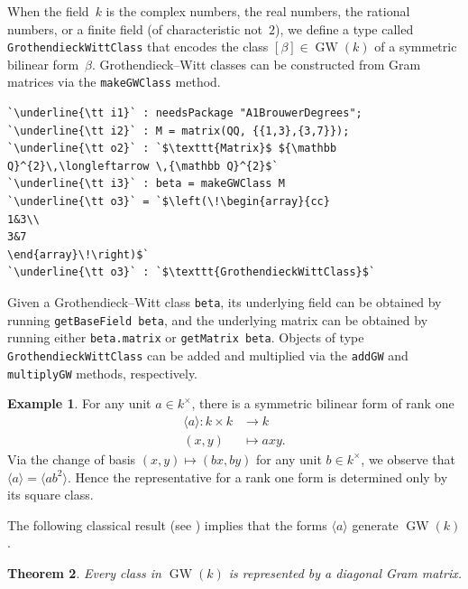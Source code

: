 \documentclass[12pt]{amsart}
\newtheorem{theorem}{Theorem}
\theoremstyle{definition}
\newtheorem{example}[theorem]{Example}
\DeclareMathOperator{\GW}{GW}
\begin{document}
When the field~$k$ is the complex numbers, the real numbers, the rational numbers, or a finite field (of characteristic not~$2$), we define a type called \texttt{GrothendieckWittClass} that encodes the class $[\beta]\in \GW(k)$ of a symmetric bilinear form~$\beta$. Grothendieck--Witt classes can be constructed from Gram matrices via the \texttt{makeGWClass} method.

\begin{lstlisting}[language=Macaulay2output]
`\underline{\tt i1}` : needsPackage "A1BrouwerDegrees";
`\underline{\tt i2}` : M = matrix(QQ, {{1,3},{3,7}});
`\underline{\tt o2}` : `$\texttt{Matrix}$ ${\mathbb Q}^{2}\,\longleftarrow \,{\mathbb Q}^{2}$`
`\underline{\tt i3}` : beta = makeGWClass M
`\underline{\tt o3}` = `$\left(\!\begin{array}{cc}
1&3\\
3&7
\end{array}\!\right)$`
`\underline{\tt o3}` : `$\texttt{GrothendieckWittClass}$`
\end{lstlisting}

Given a Grothendieck--Witt class \texttt{beta}, its underlying field can be obtained by running \texttt{getBaseField beta}, and the underlying matrix can be obtained by running either \texttt{beta.matrix} or \texttt{getMatrix beta}. Objects of type \texttt{GrothendieckWittClass} can be added and multiplied via the \texttt{addGW} and \texttt{multiplyGW} methods, respectively.

\begin{example}\label{ex:labelname} 
For any unit $a\in k^\times$, there is a symmetric bilinear form of rank one
\begin{align*}
    \langle a \rangle \colon k \times k &\to k \\
    (x,y) &\mapsto axy.
\end{align*}
Via the change of basis $(x,y)\mapsto (bx,by)$ for any unit $b\in k^\times$, we observe that $\langle a \rangle = \langle ab^2 \rangle$. Hence the representative for a rank one form is determined only by its square class.
\end{example}

The following classical result (see \cite[Corollary I.2.4]{Lam}) implies that the forms $\langle a \rangle$ generate $\GW(k)$.

\begin{theorem}\label{thm:sylvester} 
Every class in $\GW(k)$ is represented by a diagonal Gram matrix.
\end{theorem}
\end{document}
